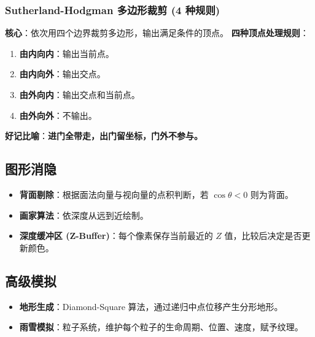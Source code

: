 \documentclass[UTF8]{ctexart}
\begin{document}
\subsubsection{Sutherland-Hodgman 多边形裁剪 (4 种规则)}
\textbf{核心}：依次用四个边界裁剪多边形，输出满足条件的顶点。
\textbf{四种顶点处理规则}：
\begin{enumerate}
    \item \textbf{由内向内}：输出当前点。
    \item \textbf{由内向外}：输出交点。
    \item \textbf{由外向内}：输出交点和当前点。
    \item \textbf{由外向外}：不输出。
\end{enumerate}
\textbf{好记比喻}：\textbf{进门全带走，出门留坐标，门外不参与。}

\subsection{图形消隐}
\begin{itemize}
    \item \textbf{背面剔除}：根据面法向量与视向量的点积判断，若 $\cos\theta < 0$ 则为背面。
    \item \textbf{画家算法}：依深度从远到近绘制。
    \item \textbf{深度缓冲区 (Z-Buffer)}：每个像素保存当前最近的 $Z$ 值，比较后决定是否更新颜色。
\end{itemize}

\subsection{高级模拟}
\begin{itemize}
    \item \textbf{地形生成}：Diamond-Square 算法，通过递归中点位移产生分形地形。
    \item \textbf{雨雪模拟}：粒子系统，维护每个粒子的生命周期、位置、速度，赋予纹理。
\end{itemize}
\end{document}
